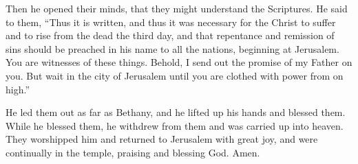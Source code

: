  Then he opened their minds, that they might understand the
Scriptures.  He said to them, ``Thus it is written, and
thus it was necessary for the Christ to suffer and to rise from the dead
the third day,  and that repentance and remission of sins
should be preached in his name to all the nations, beginning at
Jerusalem.  You are witnesses of these things.
 Behold, I send out the promise of my Father on you. But
wait in the city of Jerusalem until you are clothed with power from on
high.''

 He led them out as far as Bethany, and he lifted up his
hands and blessed them.  While he blessed them, he withdrew
from them and was carried up into heaven.  They worshipped
him and returned to Jerusalem with great joy,  and were
continually in the temple, praising and blessing God. Amen.

